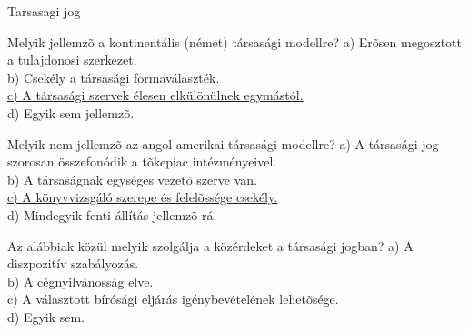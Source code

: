 \begin{frame}[plain]
\begin{tcolorbox}[center, colback={myyellow}, coltext={black}, colframe={myyellow}]
    { Tarsasagi jog}\\
\end{tcolorbox}
\end{frame}

\begin{frame}

\begin{tcolorbox}[title={60. Kérdés}]
Melyik jellemzõ a kontinentális (német) társasági modellre?
\tcblower
a) Erõsen megosztott a tulajdonosi szerkezet.\\
b) Csekély a társasági formaválaszték.\\
\uline {c) A társasági szervek élesen elkülönülnek egymástól.}\\
d) Egyik sem jellemzõ.
\end{tcolorbox}

\begin{tcolorbox}[title={61. Kérdés}]
Melyik nem jellemzõ az angol-amerikai társasági modellre?
\tcblower
a) A társasági jog szorosan összefonódik a tõkepiac intézményeivel.\\
b) A társaságnak egységes vezetõ szerve van.\\
\uline {c) A könyvvizsgáló szerepe és felelõssége csekély.}\\
d) Mindegyik fenti állítás jellemzõ rá.
\end{tcolorbox}

\begin{tcolorbox}[title={62. Kérdés}]
Az alábbiak közül melyik szolgálja a közérdeket a társasági jogban?
\tcblower
a) A diszpozitív szabályozás.\\
\uline {b) A cégnyilvánosság elve.}\\
c) A választott bírósági eljárás igénybevételének lehetõsége.\\
d) Egyik sem.
\end{tcolorbox}

\end{frame}


